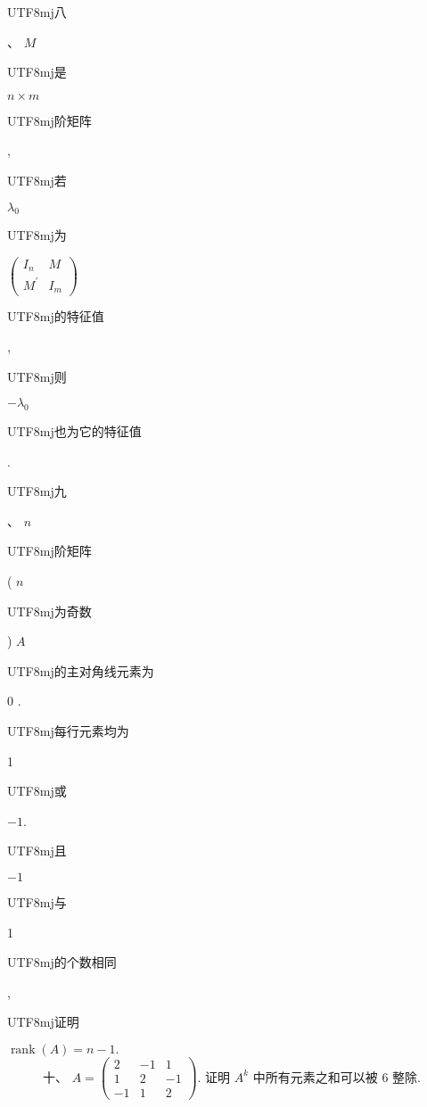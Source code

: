 \documentclass[10pt]{article}
\begin{document}
\begin{CJK}{UTF8}{mj}八\end{CJK}、 $M$ \begin{CJK}{UTF8}{mj}是\end{CJK} $n \times m$ \begin{CJK}{UTF8}{mj}阶矩阵\end{CJK}, \begin{CJK}{UTF8}{mj}若\end{CJK} $\lambda_{0}$ \begin{CJK}{UTF8}{mj}为\end{CJK} $\left(\begin{array}{cc}I_{n} & M \\ M^{\prime} & I_{m}\end{array}\right)$ \begin{CJK}{UTF8}{mj}的特征值\end{CJK}, \begin{CJK}{UTF8}{mj}则\end{CJK} $-\lambda_{0}$ \begin{CJK}{UTF8}{mj}也为它的特征值\end{CJK}.

\begin{CJK}{UTF8}{mj}九\end{CJK}、 $n$ \begin{CJK}{UTF8}{mj}阶矩阵\end{CJK} ( $n$ \begin{CJK}{UTF8}{mj}为奇数\end{CJK}) $A$ \begin{CJK}{UTF8}{mj}的主对角线元素为\end{CJK} 0 . \begin{CJK}{UTF8}{mj}每行元素均为\end{CJK} 1 \begin{CJK}{UTF8}{mj}或\end{CJK} $-1$. \begin{CJK}{UTF8}{mj}且\end{CJK} $-1$ \begin{CJK}{UTF8}{mj}与\end{CJK} 1 \begin{CJK}{UTF8}{mj}的个数相同\end{CJK}, \begin{CJK}{UTF8}{mj}证明\end{CJK} $\operatorname{rank}(A)=n-1 .$
$$
\text { 十、 } A=\left(\begin{array}{ccc}
2 & -1 & 1 \\
1 & 2 & -1 \\
-1 & 1 & 2
\end{array}\right) \text {. 证明 } A^{k} \text { 中所有元素之和可以被 } 6 \text { 整除. }
$$
\end{document}
